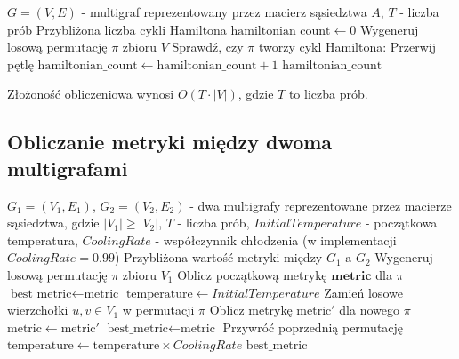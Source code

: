 \begin{algorithm}[H]
\caption{Aproksymacyjne liczenie cykli Hamiltona}
\label{alg:approx_count_hamiltonian_cycles}
\begin{algorithmic}[1]
\Require \( G = (V, E) \) - multigraf reprezentowany przez macierz sąsiedztwa \( A \), \( T \) - liczba prób
\Ensure Przybliżona liczba cykli Hamiltona
\State \( \text{hamiltonian\_count} \gets 0 \)
    \State Wygeneruj losową permutację \( \pi \) zbioru \( V \)
    \State Sprawdź, czy \( \pi \) tworzy cykl Hamiltona:
            \State Przerwij pętlę
        \EndIf
    \EndFor
        \State \( \text{hamiltonian\_count} \gets \text{hamiltonian\_count} + 1 \)
    \EndIf
\EndFor
\State \Return \( \text{hamiltonian\_count} \)
\end{algorithmic}
\end{algorithm}

Złożoność obliczeniowa wynosi \( O(T \cdot |V|) \), gdzie \( T \) to liczba prób.

\subsection{Obliczanie metryki między dwoma multigrafami}

\begin{algorithm}[H]
\caption{Aproksymacyjne obliczanie metryki między dwoma grafami}
\label{alg:approx_calculate_metric}
\begin{algorithmic}[1]
\Require \( G_1 = (V_1, E_1) \), \( G_2 = (V_2, E_2) \) - dwa multigrafy reprezentowane przez macierze sąsiedztwa, gdzie \( |V_1| \geq |V_2| \), \( T \) - liczba prób, \( InitialTemperature \) - początkowa temperatura, \( CoolingRate \) - współczynnik chłodzenia (w implementacji \( CoolingRate = 0.99 \))
\Ensure Przybliżona wartość metryki między \( G_1 \) a \( G_2 \)
\State Wygeneruj losową permutację \( \pi \) zbioru \( V_1 \)
\State Oblicz początkową metrykę \( \textbf{metric} \) dla \( \pi \)
\State \( \text{best\_metric} \gets \text{metric} \)
\State \( \text{temperature} \gets InitialTemperature \)
    \State Zamień losowe wierzchołki \( u, v \in V_1 \) w permutacji \( \pi \)
    \State Oblicz metrykę \( \text{metric}' \) dla nowego \( \pi \)
        \State \( \text{metric} \gets \text{metric}' \)
            \State \( \text{best\_metric} \gets \text{metric} \)
        \ElsIf{}
            \State Przywróć poprzednią permutację
        \EndIf
    \EndIf
    \State \( \text{temperature} \gets \text{temperature} \times CoolingRate \)
\EndFor
\State \Return \( \text{best\_metric} \)
\end{algorithmic}
\end{algorithm}

